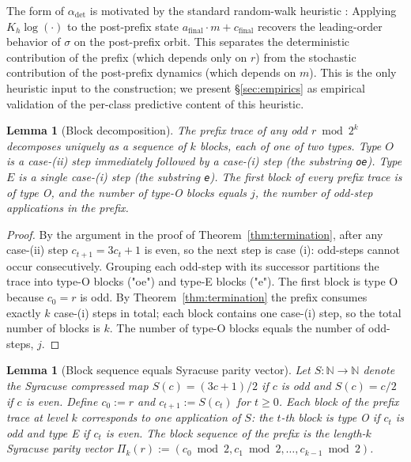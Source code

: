 \documentclass[pdflatex,sn-mathphys-num]{sn-jnl}
\theoremstyle{thmstyleone}%
\newtheorem{lemma}[theorem]{Lemma}
\theoremstyle{definition}
\theoremstyle{plain}
\begin{document}
The form of $\alpha_{\text{det}}$ is motivated by the standard random-walk heuristic \citep{lagarias1985}: Applying $K_h \log(\cdot)$ to the post-prefix state $a_{\text{final}} \cdot m + c_{\text{final}}$ recovers the leading-order behavior of $\sigma$ on the post-prefix orbit. This separates the deterministic contribution of the prefix (which depends only on $r$) from the stochastic contribution of the post-prefix dynamics (which depends on $m$). This is the only heuristic input to the construction; we present \S\ref{sec:empirics} as empirical validation of the per-class predictive content of this heuristic.

\begin{lemma}[Block decomposition]
\label{lem:block-decomposition}
The prefix trace of any odd $r \bmod 2^k$ decomposes uniquely as a sequence of $k$ blocks, each of one of two types. Type $O$ is a case-(ii) step immediately followed by a case-(i) step (the substring \texttt{oe}). Type $E$ is a single case-(i) step (the substring \texttt{e}). The first block of every prefix trace is of type O, and the number of type-O blocks equals $j$, the number of odd-step applications in the prefix.
\end{lemma}

\begin{proof}
    By the argument in the proof of Theorem~\ref{thm:termination}, after any case-(ii) step $c_{t+1} = 3 c_t + 1$ is even, so the next step is case (i): odd-steps cannot occur consecutively. Grouping each odd-step with its successor partitions the trace into type-O blocks ("oe") and type-E blocks ("e"). The first block is type O because $c_0 = r$ is odd. By Theorem~\ref{thm:termination} the prefix consumes exactly $k$ case-(i) steps in total; each block contains one case-(i) step, so the total number of blocks is $k$. The number of type-O blocks equals the number of odd-steps, $j$.
\end{proof}

\begin{lemma}[Block sequence equals Syracuse parity vector]
\label{lem:syracuse-equivalence}
Let $S \colon \mathbb{N} \to \mathbb{N}$ denote the Syracuse compressed map $S(c) = (3c+1)/2$ if $c$ is odd and $S(c) = c/2$ if $c$ is even. Define $c_0 := r$ and $c_{t+1} := S(c_t)$ for $t \geq 0$. Each block of the prefix trace at level $k$ corresponds to one application of $S$: the $t$-th block is type O if $c_t$ is odd and type E if $c_t$ is even. The block sequence of the prefix is the length-$k$ Syracuse parity vector $\Pi_k(r) := (c_0 \bmod 2, c_1 \bmod 2, \ldots, c_{k-1} \bmod 2)$.
\end{lemma}
\end{document}
